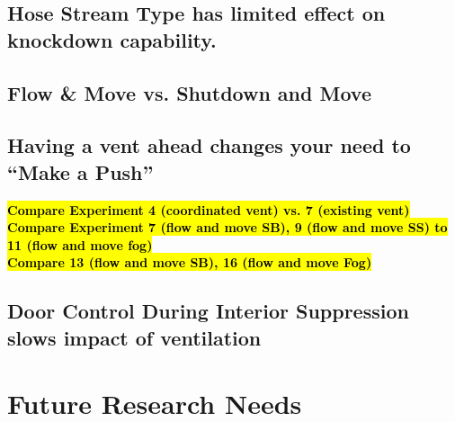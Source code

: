\documentclass[12pt,oneside]{book}
\begin{document}
\section{Hose Stream Type has limited effect on knockdown capability.}

\section{Flow \& Move vs. Shutdown and Move}

\section{Having a vent ahead changes your need to ``Make a Push''}

	\textbf{\hl{Compare Experiment 4 (coordinated vent) vs. 7 (existing vent)}} \\
	
	\textbf{\hl{Compare Experiment 7 (flow and move SB), 9 (flow and move SS) to 11 (flow and move fog)}} \\
	
	\textbf{\hl{Compare 13 (flow and move SB), 16 (flow and move Fog)}} \\

\section{Door Control During Interior Suppression slows impact of ventilation}


\chapter{Future Research Needs}






\clearpage
\end{document}

